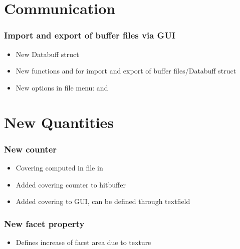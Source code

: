 \section{Communication}
\subsubsection{Import and export of buffer files via GUI}
\begin{itemize}[noitemsep,topsep=0pt]
\item New Databuff struct 
\item New functions  and  for import and export of buffer files/Databuff struct
\item New options in file menu:  and 
\end{itemize}

\section{New Quantities}
\subsubsection{New counter }
\begin{itemize}[noitemsep,topsep=0pt]
\item Covering computed in  file in 
\item Added covering counter to hitbuffer
\item Added covering to GUI, can be defined through textfield
\end{itemize}

\subsubsection{New facet property }
\begin{itemize}[noitemsep,topsep=0pt]
\item Defines increase of facet area due to texture
\end{itemize}


